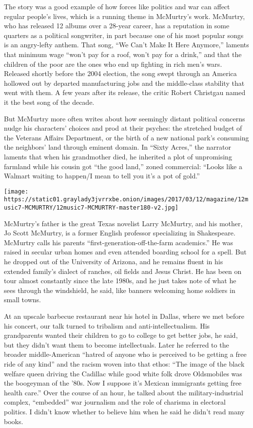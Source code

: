 The story was a good example of how forces like politics and war can
affect regular people's lives, which is a running theme in McMurtry's
work. McMurtry, who has released 12 albums over a 28-year career, has a
reputation in some quarters as a political songwriter, in part because
one of his most popular songs is an angry-lefty anthem. That song, ``We
Can't Make It Here Anymore,'' laments that minimum wage ``won't pay for
a roof, won't pay for a drink,'' and that the children of the poor are
the ones who end up fighting in rich men's wars. Released shortly before
the 2004 election, the song swept through an America hollowed out by
departed manufacturing jobs and the middle-class stability that went
with them. A few years after its release, the critic Robert Christgau
named it the best song of the decade.

But McMurtry more often writes about how seemingly distant political
concerns nudge his characters' choices and prod at their psyches: the
stretched budget of the Veterans Affairs Department, or the birth of a
new national park's consuming the neighbors' land through eminent
domain. In ``Sixty Acres,'' the narrator laments that when his
grandmother died, he inherited a plot of unpromising farmland while his
cousin got ``the good land,'' zoned commercial: ``Looks like a Walmart
waiting to happen/I mean to tell you it's a pot of gold.''

\texttt{[image: https://static01.graylady3jvrrxbe.onion/images/2017/03/12/magazine/12music7-MCMURTRY/12music7-MCMURTRY-master180-v2.jpg]}

McMurtry's father is the great Texas novelist Larry McMurtry, and his
mother, Jo Scott McMurtry, is a former English professor specializing in
Shakespeare. McMurtry calls his parents ``first-generation-off-the-farm
academics.'' He was raised in secular urban homes and even attended
boarding school for a spell. But he dropped out of the University of
Arizona, and he remains fluent in his extended family's dialect of
ranches, oil fields and Jesus Christ. He has been on tour almost
constantly since the late 1980s, and he just takes note of what he sees
through the windshield, he said, like banners welcoming home soldiers in
small towns.

At an upscale barbecue restaurant near his hotel in Dallas, where we met
before his concert, our talk turned to tribalism and
anti-intellectualism. His grandparents wanted their children to go to
college to get better jobs, he said, but they didn't want them to become
intellectuals. Later he referred to the broader middle-American ``hatred
of anyone who is perceived to be getting a free ride of any kind'' and
the racism woven into that ethos: ``The image of the black welfare queen
driving the Cadillac while good white folk drove Oldsmobiles was the
boogeyman of the '80s. Now I suppose it's Mexican immigrants getting
free health care.'' Over the course of an hour, he talked about the
military-industrial complex, ``embedded'' war journalism and the role of
charisma in electoral politics. I didn't know whether to believe him
when he said he didn't read many books.

